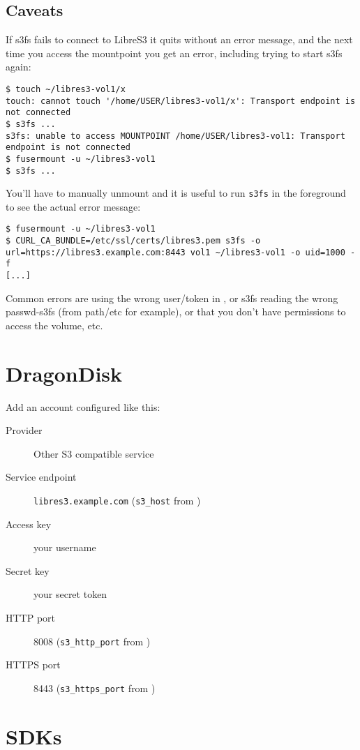 \subsection{Caveats}

If s3fs fails to connect to LibreS3 it quits without an error message,
and the next time you access the mountpoint you get an error,
including trying to start s3fs again:
\begin{lstlisting}
$ touch ~/libres3-vol1/x
touch: cannot touch '/home/USER/libres3-vol1/x': Transport endpoint is not connected
$ s3fs ...
s3fs: unable to access MOUNTPOINT /home/USER/libres3-vol1: Transport endpoint is not connected
$ fusermount -u ~/libres3-vol1
$ s3fs ...
\end{lstlisting}

You'll have to manually unmount and it is useful to run \verb|s3fs| in the
foreground to see the actual error message:
\begin{lstlisting}
$ fusermount -u ~/libres3-vol1
$ CURL_CA_BUNDLE=/etc/ssl/certs/libres3.pem s3fs -o url=https://libres3.example.com:8443 vol1 ~/libres3-vol1 -o uid=1000 -f
[...]
\end{lstlisting}

Common errors are using the wrong user/token in , or
s3fs reading the wrong passwd-s3fs (from path{/etc} for example), or that you don't have permissions to access the volume, etc.

\section{DragonDisk}
\label{sec:dragondisk}

Add an account configured like this:
\begin{description}
\item [Provider] Other S3 compatible service
\item [Service endpoint] \verb|libres3.example.com| (\verb|s3_host| from )
\item [Access key] your \SX username
\item [Secret key] your \SX secret token
\item [HTTP port] 8008 (\verb|s3_http_port| from )
\item [HTTPS port] 8443 (\verb|s3_https_port| from )
\end{description}

\section{SDKs}

